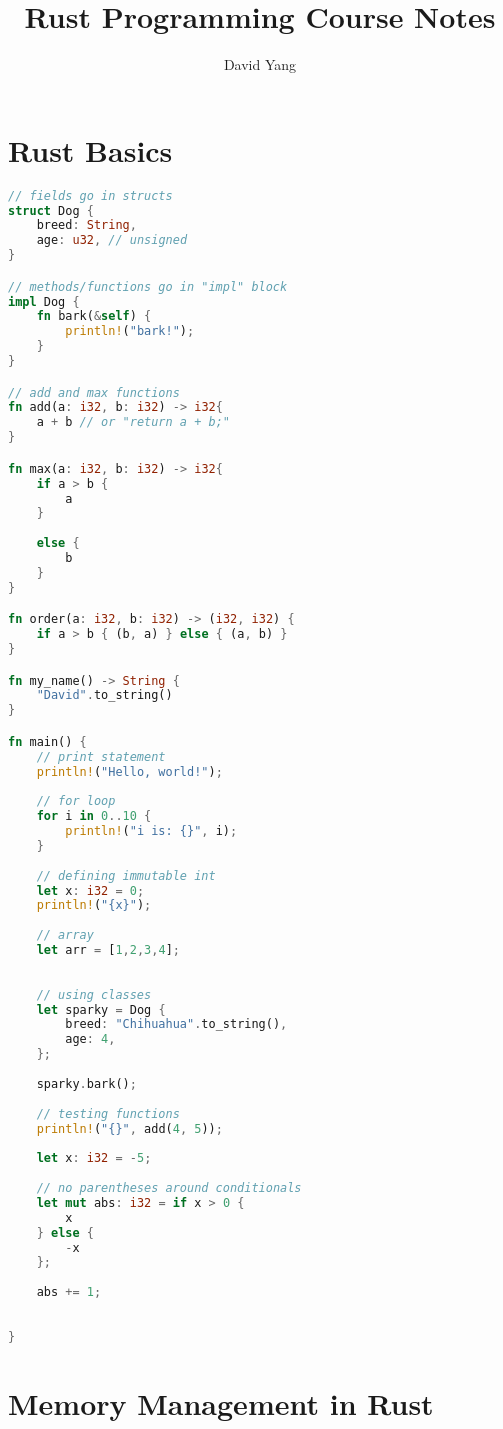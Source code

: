 \documentclass[12pt]{amsart}
\begin{document}
\title[short paper title]{Rust Programming Course Notes}
\author{David Yang}
\maketitle

\section{Rust Basics}

\begin{lstlisting}[language = Rust]
// fields go in structs
struct Dog {
    breed: String,
    age: u32, // unsigned
}

// methods/functions go in "impl" block
impl Dog {
    fn bark(&self) {
        println!("bark!");
    }
}

// add and max functions
fn add(a: i32, b: i32) -> i32{
    a + b // or "return a + b;"
}

fn max(a: i32, b: i32) -> i32{
    if a > b {
        a
    }
    
    else {
        b
    }
}

fn order(a: i32, b: i32) -> (i32, i32) {
    if a > b { (b, a) } else { (a, b) }
}

fn my_name() -> String {
    "David".to_string()
}

fn main() {
    // print statement
    println!("Hello, world!");
    
    // for loop
    for i in 0..10 {
        println!("i is: {}", i);
    }
    
    // defining immutable int 
    let x: i32 = 0;
    println!("{x}");
    
    // array 
    let arr = [1,2,3,4];
    
    
    // using classes
    let sparky = Dog {
        breed: "Chihuahua".to_string(),
        age: 4,
    };
    
    sparky.bark();
    
    // testing functions
    println!("{}", add(4, 5));
    
    let x: i32 = -5;
    
    // no parentheses around conditionals
    let mut abs: i32 = if x > 0 {
        x
    } else {
        -x
    };
    
    abs += 1;
    
    
}
\end{lstlisting}

\newpage

\section{Memory Management in Rust}
\end{document}

